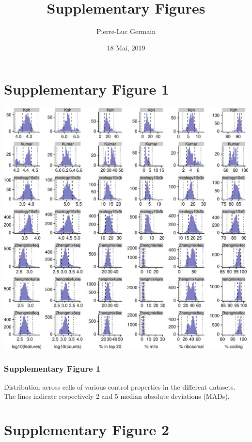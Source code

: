 \documentclass[]{article}
\title{Supplementary Figures}
\author{Pierre-Luc Germain}
\date{18 Mai, 2019}
\begin{document}
\maketitle

{
\setcounter{tocdepth}{2}
\tableofcontents
}
\newpage

\hypertarget{supplementary-figure-1}{%
\section{Supplementary Figure 1}\label{supplementary-figure-1}}

\includegraphics{supp_figures_files/figure-latex/dist_cell_properties-1.pdf}

\hypertarget{supplementary-figure-1-1}{%
\subsubsection{Supplementary Figure 1}\label{supplementary-figure-1-1}}

Distribution across cells of various control properties in the different
datasets. The lines indicate respectively 2 and 5 median absolute
deviations (MADs).

\newpage

\hypertarget{supplementary-figure-2}{%
\section{Supplementary Figure 2}\label{supplementary-figure-2}}
\end{document}

